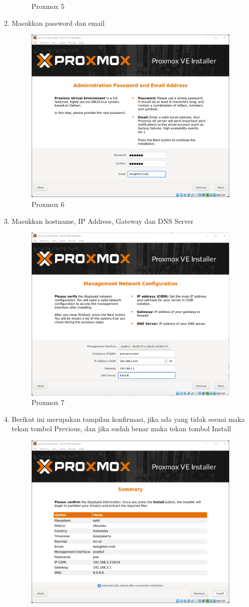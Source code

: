 \documentclass{article}
\begin{document}
\begin{enumerate}
\begin{figure}[h!]
      \caption{Proxmox 5}
    \end{figure}
    \newpage
    \item Masukkan password dan email
    \begin{figure}[h!]
      \centering
      \includegraphics[width=0.7\linewidth]{proxmox 6.png}
      \caption{Proxmox 6}
    \end{figure}
    \item Masukkan hostname, IP Address, Gateway dan DNS Server
    \begin{figure}[h!]
      \centering
      \includegraphics[width=0.7\linewidth]{proxmox 7.png}
      \caption{Proxmox 7}
    \end{figure}
    \newpage
    \item Berikut ini merupakan tampilan konfirmasi, jika ada yang tidak sesuai maka tekan tombol Previous, dan jika sudah benar maka tekan tombol Install
    \begin{figure}[h!]
      \centering
      \includegraphics[width=0.7\linewidth]{proxmox 8.png}

\end{figure}
\end{enumerate}
\end{document}

